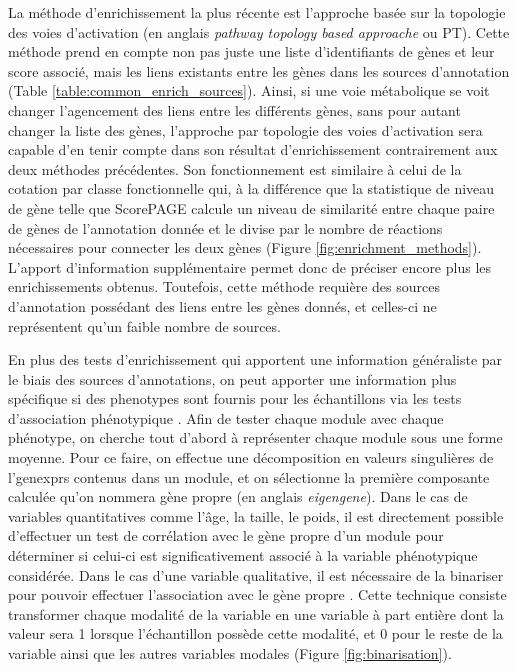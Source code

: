 La méthode d'enrichissement la plus récente est l'approche basée sur la topologie des voies d'activation (en anglais \textit{pathway topology based approache} ou PT). Cette méthode prend en compte non pas juste une liste d'identifiants de gènes et leur score associé, mais les liens existants entre les gènes dans les sources d'annotation \cite{Khatri2012} (Table \ref{table:common_enrich_sources}). Ainsi, si une voie métabolique se voit changer l'agencement des liens entre les différents gènes, sans pour autant changer la liste des gènes, l'approche par topologie des voies d'activation sera capable d'en tenir compte dans son résultat d'enrichissement contrairement aux deux méthodes précédentes. Son fonctionnement est similaire à celui de la cotation par classe fonctionnelle qui, à la différence que la statistique de niveau de gène telle que ScorePAGE \cite{Rahnenfuhrer2004Jun} calcule un niveau de similarité entre chaque paire de gènes de l'annotation donnée et le divise par le nombre de réactions nécessaires pour connecter les deux gènes (Figure \ref{fig:enrichment_methods}). L'apport d'information supplémentaire permet donc de préciser encore plus les enrichissements obtenus. Toutefois, cette méthode requière des sources d'annotation possédant des liens entre les gènes donnés, et celles-ci ne représentent qu'un faible nombre de sources.

En plus des tests d'enrichissement qui apportent une information généraliste par le biais des sources d'annotations, on peut apporter une information plus spécifique si des \glspl{phenotype} sont fournis pour les échantillons via les tests d'association phénotypique \cite{Langfelder2008}. Afin de tester chaque module avec chaque phénotype, on cherche tout d'abord à représenter chaque module sous une forme moyenne. Pour ce faire, on effectue une décomposition en valeurs singulières de l'\glspl{genexpr} contenus dans un module, et on sélectionne la première composante calculée qu'on nommera gène propre (en anglais \textit{eigengene}). Dans le cas de variables quantitatives comme l'âge, la taille, le poids, il est directement possible d'effectuer un test de corrélation avec le gène propre d'un module pour déterminer si celui-ci est significativement associé à la variable phénotypique considérée. Dans le cas d'une variable qualitative, il est nécessaire de la binariser pour pouvoir effectuer l'association avec le gène propre \cite{Lemoine2021Dec}. Cette technique consiste transformer chaque modalité de la variable en une variable à part entière dont la valeur sera 1 lorsque l'échantillon possède cette modalité, et 0 pour le reste de la variable ainsi que les autres variables modales (Figure \ref{fig:binarisation}).

